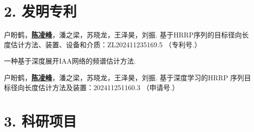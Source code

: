 \begin{resume}
  \section*{2. 发明专利} %
  \begin{enumerate}[label={[\arabic*]},itemsep=0pt,parsep=0pt,labelindent=26pt,labelwidth=*,leftmargin=0pt,itemindent=*,align=left]
  \item 户盼鹤，\textbf{\underline{陈凌峰}}，潘之梁，苏晓龙，王泽昊，刘振. 基于HRRP序列的目标径向长度估计方法、装置、设备和介质：ZL202411235169.5 （专利号.）
  \item 
  \item 
  \item 
  \item 
  \item 一种基于深度展开IAA网络的频谱估计方法.
  \item 户盼鹤，\textbf{\underline{陈凌峰}}，潘之梁，苏晓龙，王泽昊，刘振. 基于深度学习的HRRP 序列目标径向长度估计方法及装置：202411251160.3 （申请号.）
  \end{enumerate}

    \section*{3. 科研项目} %
  \begin{enumerate}[label={[\arabic*]},itemsep=0pt,parsep=0pt,labelindent=26pt,labelwidth=*,leftmargin=0pt,itemindent=*,align=left]
  \item 
  \end{enumerate}
\end{resume}
